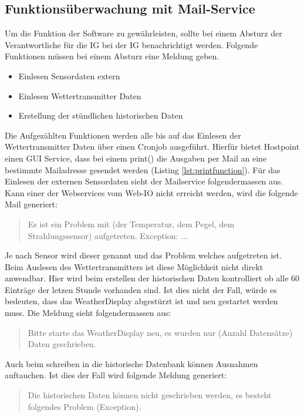 \subsection{Funktionsüberwachung mit Mail-Service}\label{kap:Funktionsüberwachung}
Um die Funktion der Software zu gewährleisten, sollte bei einem Absturz der Verantwortliche für die IG bei der IG benachrichtigt werden. Folgende Funktionen müssen bei einem Absturz eine Meldung geben.
\begin{itemize}
\item Einlesen Sensordaten extern
\item Einlesen Wettertransmitter Daten
\item Erstellung der stündlichen historischen Daten
\end{itemize}
Die Aufgezählten Funktionen werden alle bis auf das Einlesen der Wettertransmitter Daten über einen Cronjob ausgeführt. Hierfür bietet Hostpoint einen GUI Service, dass bei einem print() die Ausgaben per Mail an eine bestimmte Mailadresse gesendet werden (Listing \ref{lst:printfunction}). Für das Einlesen der externen Sensordaten sieht der Mailservice folgendermassen aus. Kann einer der Webservices vom Web-IO nicht erreicht werden, wird die folgende Mail generiert:\\
\begin{quote}
Es ist ein Problem mit (der Temperatur, dem Pegel, dem Strahlungssensor) aufgetreten. Exception: ...\\
\end{quote}
Je nach Sensor wird dieser genannt und das Problem welches aufgetreten ist. Beim Auslesen des Wettertransmitters ist diese Möglichkeit nicht direkt anwendbar. Hier wird beim erstellen der historischen Daten kontrolliert ob alle 60 Einträge der letzen Stunde vorhanden sind. Ist dies nicht der Fall, würde es bedeuten, dass das WeatherDisplay abgestürzt ist und neu gestartet werden muss. Die Meldung sieht folgendermassen aus:\\
\begin{quote}
Bitte starte das WeatherDisplay neu, es wurden nur (Anzahl Datensätze) Daten geschrieben.
\end{quote}

Auch beim schreiben in die historische Datenbank können Ausnahmen auftauchen. Ist dies der Fall wird folgende Meldung generiert:\\
\begin{quote}
Die historischen Daten können nicht geschrieben werden, es besteht folgendes Problem (Exception).
\end{quote}

